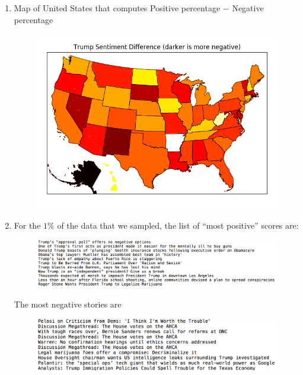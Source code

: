 \documentclass{article}
\newcommand{\percent}{$1\%$ }
\begin{document}
\begin{enumerate}
\item Map of United States that computes Positive percentage $-$ Negative percentage
\begin{figure}[!ht]
\centering
\includegraphics[width=.6\textwidth]{diffmap.png}	
\end{figure}

\newpage
\item For the \percent of the data that we sampled, the list of ``most positive'' scores are:
\begin{figure}[!ht]
\includegraphics[width=.8\textwidth]{pos10.png}	
\end{figure}

\indent The most negative stories are
\begin{figure}[!ht]
\includegraphics[width=.8\textwidth]{neg10.png}
\end{figure}
\begin{table}
\begin{tabular}{c}   	
\end{tabular}	
\end{table}
\newpage


\end{enumerate}
\end{document}
